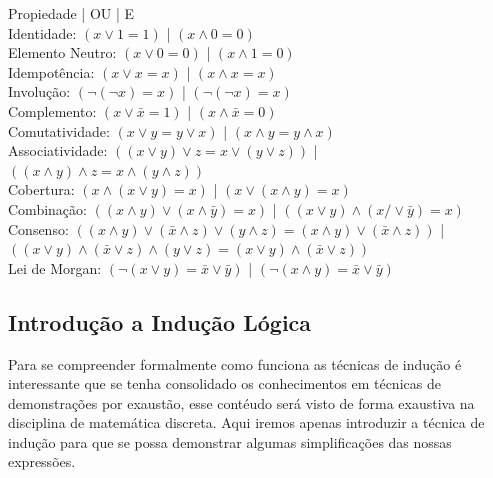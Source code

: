 \documentclass[12pt, onecolumn]{article}
\begin{document}
	Propiedade | OU | E \\ 
	\newline
	Identidade: $(x \lor 1 = 1)$ | $(x \land 0 = 0)$ \\
	\newline
	Elemento Neutro: $(x \lor 0 = 0)$ | $(x \land 1 = 0)$ \\
	\newline
	Idempotência: $(x \lor x = x)$ | $(x \land x = x)$ \\ 
	\newline
	Involução: $(\lnot(\lnot x) = x)$ | $(\lnot(\lnot x) = x)$ \\ 
	\newline
	Complemento: $(x \lor \bar{x} = 1)$ | $(x \land \bar{x} = 0)$ \\ 
	\newline
	Comutatividade: $(x \lor y = y \lor x)$ | $(x \land y = y \land x)$ \\
	\newline
	Associatividade: $((x \lor y) \lor z = x \lor (y \lor z))$ | 
	$((x \land y) \land z = x \land (y \land z))$ \\
	\newline
	Cobertura: $(x \land (x \lor y) = x)$ | $(x \lor (x \land y) = x)$ \\
	\newline
	Combinação: $((x \land y) \lor (x \land \bar{y}) = x)$ | 
	$((x \lor y) \land (x /\lor \bar{y}) = x)$ \\
	\newline
	Consenso: $((x \land y) \lor (\bar{x} \land z) \lor (y \land z) = 
	(x \land y) \lor (\bar{x} \land z))$ | 
	$((x \lor y) \land (\bar{x} \lor z) \land (y \lor z) = 
	(x \lor y) \land (\bar{x} \lor z))$ \\
	\newline
	Lei de Morgan: $(\lnot(x \lor y) = \bar{x} \lor \bar{y})$ | 
	$(\lnot(x \land y) = \bar{x} \lor \bar{y})$ \\

	\subsection{\centering Introdução a Indução Lógica}
	
	Para se compreender formalmente como funciona as técnicas de indução
	é interessante que se tenha consolidado os conhecimentos em técnicas 
	de demonstrações por exaustão, esse contéudo será visto de forma exaustiva 
	na disciplina de matemática discreta. Aqui iremos apenas introduzir a 
	técnica de indução para que se possa demonstrar algumas simplificações 
	das nossas expressões.
		
\end{document}
